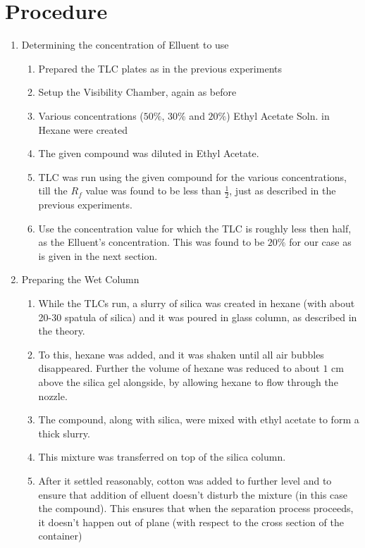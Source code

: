 \section{Procedure}	
	\begin{enumerate}
		\item Determining the concentration of Elluent to use
		\begin{enumerate}
			\item Prepared the TLC plates as in the previous experiments
			\item Setup the Visibility Chamber, again as before
			\item Various concentrations ($50\%$, $30\%$ and $20\%$) Ethyl Acetate Soln. in Hexane were created
			\item The given compound was diluted in Ethyl Acetate.
			\item TLC was run using the given compound for the various concentrations, till the $R_f$ value was found to be less than $\frac 1 2$, just as described in the previous experiments. 
			\item Use the concentration value for which the TLC is roughly less then half, as the Elluent's concentration. This was found to be $20\%$ for our case as is given in the next section.
		\end{enumerate}
		\item Preparing the Wet Column
		\begin{enumerate}
			\item While the TLCs run, a slurry of silica was created in hexane (with about 20-30 spatula of silica) and it was poured in glass column, as described in the theory.
			\item To this, hexane was added, and it was shaken until all air bubbles disappeared. Further the volume of hexane was reduced to about $1$ cm above the silica gel alongside, by allowing hexane to flow through the nozzle.
			\item The compound, along with silica, were mixed with ethyl acetate to form a thick slurry.
			\item This mixture was transferred on top of the silica column.
			\item After it settled reasonably, cotton was added to further level and to ensure that addition of elluent doesn't disturb the mixture (in this case the compound). This ensures that when the separation process proceeds, it doesn't happen out of plane (with respect to the cross section of the container)

\end{enumerate}
\end{enumerate}
